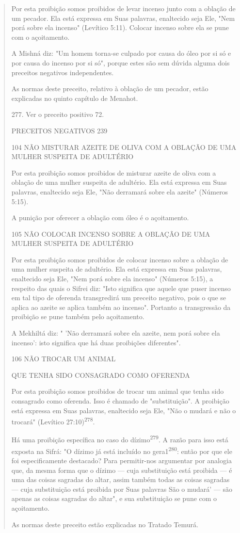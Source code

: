 \begin{quote}
Por esta proibição somos proibidos de levar incenso junto com a oblação
de um pecador. Ela está expressa em Suas palavras, enaltecido seja Ele,
"Nem porá sobre ela incenso" (Levítico 5:11). Colocar incenso sobre ela
se pu­ne com o açoitamento.

A Mishná diz: "Um homem torna-se culpado por causa do óleo por si só e
por causa do incenso por si só", porque estes são sem dúvida alguma dois
preceitos negativos independentes.

As normas deste preceito, relativo à oblação de um pecador, estão
explicadas no quinto capítulo de Menahot.

277. Ver o preceito positivo 72.

PRECEITOS NEGATIVOS 239

104 NÃO MISTURAR AZEITE DE OLIVA COM A OBLAÇÃO DE UMA MULHER SUSPEITA DE
ADULTÉRIO

Por esta proibição somos proibidos de misturar azeite de oliva com a
oblação de uma mulher suspeita de adultério. Ela está expressa em Suas
pala­vras, enaltecido seja Ele, "Não derramará sobre ela azeite"
(Números 5:15).

A punição por oferecer a oblação com óleo é o açoitamento.

105 NÃO COLOCAR INCENSO SOBRE A OBLAÇÃO DE UMA MULHER SUSPEITA DE
ADULTÉRIO

Por esta proibição somos proibidos de colocar incenso sobre a obla­ção
de uma mulher suspeita de adultério. Ela está expressa em Suas palavras,
enaltecido seja Ele, "Nem porá sobre ela incenso" (Números 5:15), a
respeito das quais o Sifrei diz: "Isto significa que aquele que puser
incenso em tal tipo de oferenda transgredirá um preceito negativo, pois
o que se aplica ao azeite se aplica também ao incenso". Portanto a
transgressão da proibição se pune também pelo açoitamento.

A Mekhiltá diz: " 'Não derramará sobre ela azeite, nem porá sobre ela
incenso': isto significa que há duas proibições diferentes".

106 NÃO TROCAR UM ANIMAL

QUE TENHA SIDO CONSAGRADO COMO OFERENDA

Por esta proibição somos proibidos de trocar um animal que tenha sido
consagrado como oferenda. Isso é chamado de "substituição". A proibi­ção
está expressa em Suas palavras, enaltecido seja Ele, "Não o mudará e não
o trocará" (Levítico 27:10)\textsuperscript{278}.

Há uma proibição específica no caso do dízimo\textsuperscript{279}. A
razão para is­so está exposta na Sifrá: "O dízimo já está incluído no
gera1\textsuperscript{280}: então por que ele foi especificamente
destacado? Para permitir-nos argumentar por analogia que, da mesma forma
que o dízimo --- cuja substituição está proibida --- é uma das coisas
sagradas do altar, assim também todas as coisas sagradas --- cuja
subs­tituição está proibida por Suas palavras São o mudará' --- são
apenas as coisas sagradas do altar", e sua substituição se pune com o
açoitamento.

As normas deste preceito estão explicadas no Tratado Temurá.
\end{quote}

